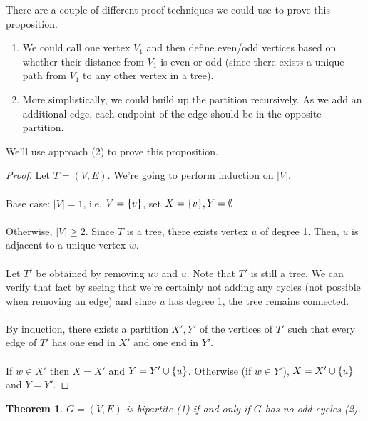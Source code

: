 \documentclass[]{article}
\newtheorem*{theorem}{Theorem}
\theoremstyle{definition}
\DeclarePairedDelimiter{\set}{\lbrace}{\rbrace}
\begin{document}
			There are a couple of different proof techniques we could use to prove this proposition.
			\begin{enumerate}
				\item We could call one vertex $V_1$ and then define even/odd vertices based on whether their distance from $V_1$ is even or odd (since there exists a unique path from $V_1$ to any other vertex in a tree). 
				\item More simplistically, we could build up the partition recursively. As we add an additional edge, each endpoint of the edge should be in the opposite partition.
			\end{enumerate}

			We'll use approach (2) to prove this proposition.
			\begin{proof}
				Let $T = (V, E)$. We're going to perform induction on $|V|$.
				\\ \\
				Base case: $|V| = 1$, i.e. $V = \set{v}$, set $X = \set{v}, Y = \emptyset$.
				\\ \\
				Otherwise, $|V| \ge 2$. Since $T$ is a tree, there exists vertex $u$ of degree 1. Then, $u$ is adjacent to a unique vertex $w$.
				\\ \\
				Let $T'$ be obtained by removing $uv$ and $u$. Note that $T'$ is still a tree. We can verify that fact by seeing that we're certainly not adding any cycles (not possible when removing an edge) and since $u$ has degree 1, the tree remains connected.
				\\ \\
				By induction, there exists a partition $X', Y'$ of the vertices of $T'$ such that every edge of $T'$ has one end in $X'$ and one end in $Y'$.
				\\ \\
				If $w \in X'$ then $X = X'$ and $Y = Y' \cup \set{u}$. Otherwise (if $w \in Y'$), $X = X' \cup \set{u}$ and $Y = Y'$.
			\end{proof}

			\begin{theorem}
				$G = (V, E)$ is bipartite (1) if and only if $G$ has no odd cycles (2).
			\end{theorem}
\end{document}
